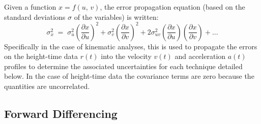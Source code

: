 \documentclass[namedreferences]{SolarPhysics}
\begin{document}
\begin{article}



Given a function $x=f(u,\,v)$, the error propagation equation (based on the standard deviations $\sigma$ of the variables) is written:
\begin{equation}
\label{eqn_errorprop}
\sigma_x^2 \; = \; \sigma_u^2 \left(\frac{\partial x}{\partial u}\right) ^2 + \sigma_v^2 \left( \frac{\partial x}{\partial v} \right) ^2 + 2 \sigma_{uv}^2 \left( \frac{\partial x}{\partial u} \right) \left( \frac{\partial x}{\partial v} \right) + ...
\end{equation}
Specifically in the case of kinematic analyses, this is used to propagate the errors on the height-time data $r(t)$ into the velocity $v(t)$ and acceleration $a(t)$ profiles to determine the associated uncertainties for each technique detailed below. In the case of height-time data the covariance terms are zero because the quantities are uncorrelated.

\subsection{Forward Differencing} %
\label{sect_forward}


\end{article}
\end{document}
